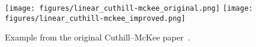 \begin{figure}[ht]
    \centering
    \texttt{[image: figures/linear\_cuthill-mckee\_original.png]}
    \texttt{[image: figures/linear\_cuthill-mckee\_improved.png]}
    \caption{Example from the original Cuthill--McKee paper~\cite{cuthill1969reducing}.}%
    \label{figure:linear_example_from_cuthill_mckee}
\end{figure}

